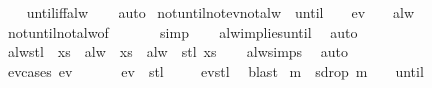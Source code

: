 \begin{isabellebody}
%
\isadelimproof
\ \ %
\endisadelimproof
%
\isatagproof
{}\isamarkupfalse%
\ until{\isacharunderscore}iff{\isacharunderscore}alw\isanewline
\ \ \isamarkupfalse%
\ auto%
\endisatagproof
{\isafoldproof}%
%
\isadelimproof
\isanewline
%
\endisadelimproof
\isanewline
{}\isamarkupfalse%
\ not{\isacharunderscore}until{\isacharunderscore}not{\isacharunderscore}ev{\isacharunderscore}not{\isacharunderscore}alw{\isacharcolon}\ {\isachardoublequoteopen}{\isasymnot}{\isacharparenleft}{\isasymphi}\ until\ {\isasympsi}{\isacharparenright}\ {\isasymomega}\ {\isasymLongrightarrow}\ {\isasymnot}ev\ {\isasympsi}\ {\isasymomega}\ {\isasymLongrightarrow}\ {\isasymnot}alw\ {\isasymphi}\ {\isasymomega}{\isachardoublequoteclose}\isanewline
%
\isadelimproof
\ \ %
\endisadelimproof
%
\isatagproof
{}\isamarkupfalse%
\ not{\isacharunderscore}until{\isacharunderscore}not{\isacharunderscore}alw{\isacharbrackleft}of\ {\isasymphi}\ {\isasympsi}\ {\isasymomega}{\isacharbrackright}\isanewline
\ \ \isamarkupfalse%
\ simp\isanewline
\ \ \isamarkupfalse%
\ alw{\isacharunderscore}implies{\isacharunderscore}until\ \isamarkupfalse%
\ auto%
\endisatagproof
{\isafoldproof}%
%
\isadelimproof
\isanewline
%
\endisadelimproof
\isanewline
{}\isamarkupfalse%
\ alw{\isacharunderscore}stl{\isacharcolon}\ {\isachardoublequoteopen}{\isasymphi}\ xs\ {\isasymLongrightarrow}\ alw\ {\isasymphi}\ xs\ {\isacharequal}\ alw\ {\isasymphi}\ {\isacharparenleft}stl\ xs{\isacharparenright}{\isachardoublequoteclose}\isanewline
%
\isadelimproof
\ \ %
\endisadelimproof
%
\isatagproof
{}\isamarkupfalse%
\ alw{\isachardot}simps\ \isamarkupfalse%
\ auto%
\endisatagproof
{\isafoldproof}%
%
\isadelimproof
\isanewline
%
\endisadelimproof
\isanewline
{}\isamarkupfalse%
\ ev{\isacharunderscore}cases{\isacharcolon}\ {\isachardoublequoteopen}ev\ {\isasymphi}\ {\isasymomega}\ {\isacharequal}\ {\isasymphi}\ {\isasymomega}\ {\isasymor}\ ev\ {\isasymphi}\ {\isacharparenleft}stl\ {\isasymomega}{\isacharparenright}{\isachardoublequoteclose}\isanewline
%
\isadelimproof
\ \ %
\endisadelimproof
%
\isatagproof
{}\isamarkupfalse%
\ ev{\isacharunderscore}stl\ \isamarkupfalse%
\ blast%
\endisatagproof
{\isafoldproof}%
%
\isadelimproof
\isanewline
%
\endisadelimproof
\isanewline
{}\isamarkupfalse%
\ {\isachardoublequoteopen}{\isasymforall}m{\isachardot}\ {\isasymphi}\ {\isacharparenleft}sdrop\ m\ {\isasymomega}{\isacharparenright}\ {\isasymLongrightarrow}\ {\isacharparenleft}{\isasymphi}\ until\ {\isasympsi}{\isacharparenright}\ {\isasymomega}{\isachardoublequoteclose}\isanewline

\end{isabellebody}
